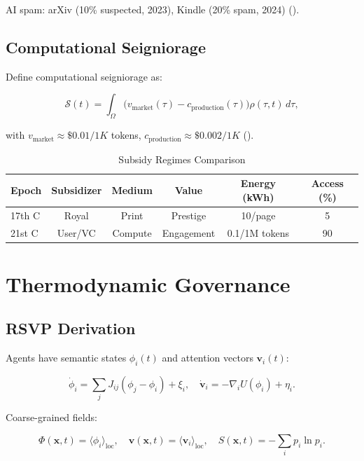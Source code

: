 \documentclass[12pt]{article}
\begin{document}
AI spam: arXiv (10\% suspected, 2023), Kindle (20\% spam, 2024) (\citealp{Zitron2024}).

\subsection{Computational Seigniorage}

Define computational seigniorage as:

\[
\mathcal{S}(t) = \int_{\Omega} \big( v_{\text{market}}(\tau) - c_{\text{production}}(\tau) \big) \rho(\tau, t) \, d\tau,
\]

with \(v_{\text{market}} \approx \$0.01/1K\) tokens, \(c_{\text{production}} \approx \$0.002/1K\) (\citealp{OpenAI2025}).

\begin{table}[h]
\caption{Subsidy Regimes Comparison}
\begin{center}
\begin{tabular}{lccccc}
\toprule
\textbf{Epoch} & \textbf{Subsidizer} & \textbf{Medium} & \textbf{Value} & \textbf{Energy (kWh)} & \textbf{Access (\%)} \\
\midrule
17th C & Royal & Print & Prestige & 10/page & 5 \\
21st C & User/VC & Compute & Engagement & 0.1/1M tokens & 90 \\
\bottomrule
\end{tabular}
\end{center}
\label{tab:subsidy}
\end{table}

\section{Thermodynamic Governance}

\subsection{RSVP Derivation}

Agents have semantic states \(\phi_i(t)\) and attention vectors \(\mathbf{v}_i(t)\):

\[
\dot{\phi}_i = \sum_j J_{ij}(\phi_j - \phi_i) + \xi_i, \quad \dot{\mathbf{v}}_i = -\nabla_i U(\phi_i) + \eta_i.
\]

Coarse-grained fields:

\[
\Phi(\mathbf{x},t) = \langle \phi_i \rangle_{\text{loc}}, \quad \mathbf{v}(\mathbf{x},t) = \langle \mathbf{v}_i \rangle_{\text{loc}}, \quad S(\mathbf{x},t) = -\sum_i p_i \ln p_i.
\]
\end{document}

